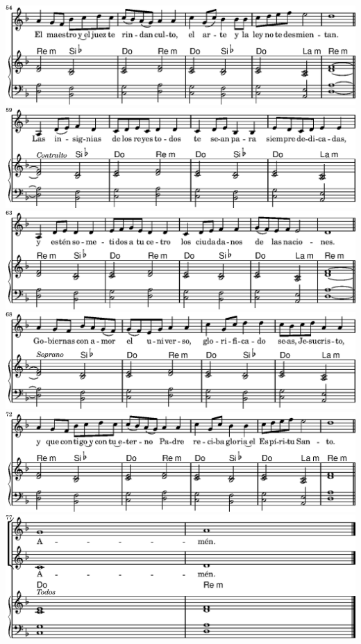 \ifx\betweenLilyPondSystem \undefined
  \linebreak
\else
  \expandafter{}%
\fi
\includegraphics{05/lily-8a2afe59-17}%
\ifx\betweenLilyPondSystem \undefined
  \linebreak
\else
  \expandafter{}%
\fi
\includegraphics{05/lily-8a2afe59-18}%
\ifx\betweenLilyPondSystem \undefined
  \linebreak
\else
  \expandafter{}%
\fi
\includegraphics{05/lily-8a2afe59-19}%
\ifx\betweenLilyPondSystem \undefined
  \linebreak
\else
  \expandafter{}%
\fi
\includegraphics{05/lily-8a2afe59-20}%
\ifx\betweenLilyPondSystem \undefined
  \linebreak
\else
  \expandafter{}%
\fi
\includegraphics{05/lily-8a2afe59-21}%
\ifx\betweenLilyPondSystem \undefined
  \linebreak
\else
  \expandafter{}%
\fi
\includegraphics{05/lily-8a2afe59-22}%
